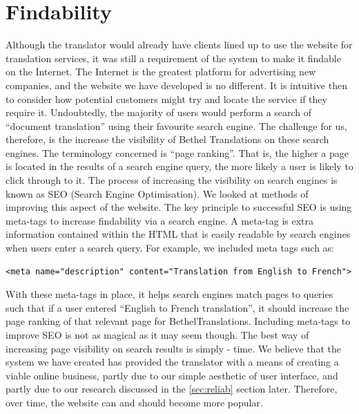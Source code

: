 \documentclass{l3proj}
\begin{document}
\section{Findability}
Although the translator would already have clients lined up to use the website for translation 
services, it was still a requirement of the system to make it findable on the Internet. The Internet
is the greatest platform for advertising new companies, and the website we have developed is no different.
It is intuitive then to consider how potential customers might try and locate the service if they require it.
Undoubtedly, the majority of users would perform a search of ``document translation'' using their favourite
search engine. The challenge for us, therefore, is the increase the visibility of Bethel Translations on
these search engines. The terminology concerned is ``page ranking''. That is, the higher a page is located
in the results of a search engine query, the more likely a user is likely to click through to it. \newline
The process of increasing the visibility on search engines is known as SEO (Search Engine Optimisation). We 
looked at methods of improving this aspect of the website.  The key principle to successful SEO is using
meta-tags to increase findability via a search engine. A meta-tag is extra information contained within the HTML
that is easily readable by search engines when users enter a search query. For example, we included meta tags
such as:
\begin{lstlisting}
<meta name="description" content="Translation from English to French">
\end{lstlisting}
With these meta-tags in place, it helps search engines match pages to queries such that if a user entered ``English to
French translation'', it should increase the page ranking of that relevant page for BethelTranslations. Including
meta-tags to improve SEO is not as magical as it may seem though. The best way of increasing page visibility on 
search results is simply - time. We believe that the system we have created has provided the translator with a means
of creating a viable online business, partly due to our simple aesthetic of user interface, and partly due to our
research discussed in the \ref{sec:reliab} section later. Therefore, over time, the website can and should become
more popular.
\end{document}
